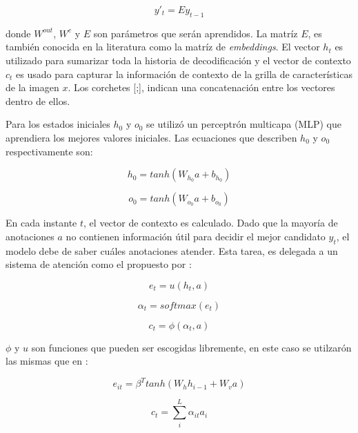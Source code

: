 \begin{equation}
    y'_{t} = E y_{t-1}
\end{equation}

donde $W ^ {out}$, $W ^ {c}$ y $E$ son parámetros que serán aprendidos. La matríz $E$, es también conocida en la literatura como la matríz de \textit{embeddings}. El vector $h_{t}$ es utilizado para sumarizar toda la historia de decodificación y el vector de contexto $c_{t}$ es usado para capturar la información de contexto de la grilla de características de la imagen $x$. Los corchetes [;], indican una concatenación entre los vectores dentro de ellos.

Para los estados iniciales $h_{0}$ y $o_{0}$ se utilizó un perceptrón multicapa (MLP) que aprendiera los mejores valores iniciales. Las ecuaciones que describen $h_{0}$ y $o_{0}$ respectivamente son:

\begin{equation}
    h_{0} = tanh(W_{h_{0}}a + b_{h_{0}})
\end{equation}

\begin{equation}
    o_{0} = tanh(W_{o_{0}}a + b_{o_{0}})
\end{equation}

En cada instante $t$, el vector de contexto es calculado. Dado que la mayoría de anotaciones $a$ no contienen información útil para decidir el mejor candidato $y_{t}$, el modelo debe de saber cuáles anotaciones atender. Esta tarea, es delegada a un sistema de atención como el propuesto por \cite{bahdanau2014neural}:

\begin{equation}
    e_{t} = u(h_{t}, a)
\end{equation}

\begin{equation}
    \alpha_{t} = softmax(e_{t})
\end{equation}

\begin{equation}
    c_{t} = \phi(\alpha_{t}, a)
\end{equation}

$\phi$ y $u$ son funciones que pueden ser escogidas libremente, en este caso se utilzarón las mismas que en \cite{harvard}:

\begin{equation}
    e_{it} = \beta ^ {T} tanh(W_{h}h_{i-1} + W_{v}a)
\end{equation}

\begin{equation}
    c_{t} = \sum_{i} ^ {L} \alpha_{it}a_{i}
\end{equation}

